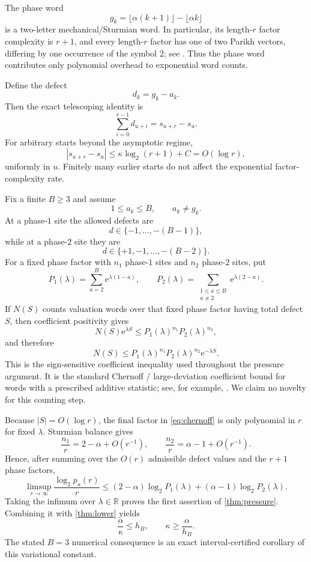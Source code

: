 \documentclass[11pt]{amsart}
\newcommand{\e}{\mathrm e}
\begin{document}
The phase word
\[
 g_k=\lfloor\alpha(k+1)\rfloor-\lfloor\alpha k\rfloor
\]
is a two-letter mechanical/Sturmian word.  In particular, its length-\(r\) factor complexity is \(r+1\), and every length-\(r\) factor has one of two Parikh vectors, differing by one occurrence of the symbol \(2\); see \cite{MorseHedlund1940}.  Thus the phase word contributes only polynomial overhead to exponential word counts.

Define the defect
\[
 d_k=g_k-a_k.
\]
Then the exact telescoping identity is
\begin{equation}\label{eq:defectsum}
 \sum_{i=0}^{r-1}d_{u+i}
 =s_{u+r}-s_u.
\end{equation}
For arbitrary starts beyond the asymptotic regime,
\[
 |s_{u+r}-s_u|
 \le \kappa\log_2(r+1)+C
 =O(\log r),
\]
uniformly in \(u\).  Finitely many earlier starts do not affect the exponential factor-complexity rate.

Fix a finite \(B\ge3\) and assume
\[
 1\le a_k\le B,
 \qquad a_k\ne g_k.
\]
At a phase-\(1\) site the allowed defects are
\[
 d\in\{-1,\ldots,-(B-1)\},
\]
while at a phase-\(2\) site they are
\[
 d\in\{+1,-1,\ldots,-(B-2)\}.
\]
For a fixed phase factor with \(n_1\) phase-\(1\) sites and \(n_2\) phase-\(2\) sites, put
\[
 P_1(\lambda)=\sum_{a=2}^B\e^{\lambda(1-a)},
\qquad
 P_2(\lambda)=\sum_{\substack{1\le a\le B\\a\ne2}}
 \e^{\lambda(2-a)}.
\]
If \(N(S)\) counts valuation words over that fixed phase factor having total defect \(S\), then coefficient positivity gives
\[
 N(S)\e^{\lambda S}
 \le P_1(\lambda)^{n_1}P_2(\lambda)^{n_2},
\]
and therefore
\begin{equation}\label{eq:chernoff}
 N(S)
 \le P_1(\lambda)^{n_1}P_2(\lambda)^{n_2}
 \e^{-\lambda S}.
\end{equation}
This is the sign-sensitive coefficient inequality used throughout the pressure argument. It is the standard Chernoff / large-deviation coefficient bound for words with a prescribed additive statistic; see, for example, \cite{DemboZeitouni1998}.  We claim no novelty for this counting step.

Because \(|S|=O(\log r)\), the final factor in \eqref{eq:chernoff} is only polynomial in \(r\) for fixed \(\lambda\).  Sturmian balance gives
\[
 \frac{n_1}{r}=2-\alpha+O(r^{-1}),
 \qquad
 \frac{n_2}{r}=\alpha-1+O(r^{-1}).
\]
Hence, after summing over the \(O(r)\) admissible defect values and the \(r+1\) phase factors,
\[
 \limsup_{r\to\infty}\frac{\log_2p_a(r)}r
 \le
 (2-\alpha)\log_2P_1(\lambda)
 +(\alpha-1)\log_2P_2(\lambda).
\]
Taking the infimum over \(\lambda\in\mathbb R\) proves the first assertion of \cref{thm:pressure}.  Combining it with \cref{thm:lower} yields
\[
 \frac{\alpha}{\kappa}\le h_B,
\qquad
 \kappa\ge\frac{\alpha}{h_B}.
\]
The stated \(B=3\) numerical consequence is an exact interval-certified corollary of this variational constant.
\end{document}
